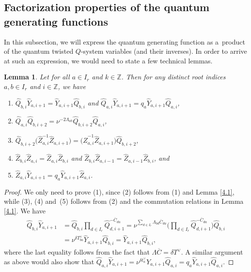 \documentclass[pdftex]{sigma}
\numberwithin{equation}{section}
\newtheorem{Lemma}[Theorem]{Lemma}
\begin{document}
\subsection{Factorization properties of the quantum generating functions}\label{Section 4.3}

In this subsection, we will express the quantum generating function  as a~product of the quantum twisted $Q$-system variables (and their inverses). In order to arrive at such an expression, we would need to state a few technical lemmas.

\begin{Lemma}\label{4.5}
Let  for all $a\in I_r$ and $k\in\mathbb{Z}$. Then for any distinct root indices $a,b\in I_r$ and $i\in\mathbb{Z}$, we have
\begin{enumerate}\itemsep=0pt
\item[$(1)$] $\widehat{Q}_{b,i}\widehat{Y}_{a,i+1}=\widehat{Y}_{a,i+1}\widehat{Q}_{b,i}$ and $\widehat{Q}_{a,i}\widehat{Y}_{a,i+1}=q_a\widehat{Y}_{a,i+1}\widehat{Q}_{a,i}$,
\item[$(2)$] $\widehat{Q}_{a,i}\widehat{Q}_{b,i+2}=\nu^{-2\Lambda_{ab}}\widehat{Q}_{b,i+2}\widehat{Q}_{a,i}$,
\item[$(3)$] $\widehat{Q}_{b,i+2}\bigl(\widehat{Z}_{a,i}^{-1}\widehat{Z}_{a,i+1}\bigr)=\bigl(\widehat{Z}_{a,i}^{-1}\widehat{Z}_{a,i+1}\bigr)\widehat{Q}_{b,i+2}$,
\item[$(4)$] $\widehat{Z}_{b,i}\widehat{Z}_{a,i}=\widehat{Z}_{a,i}\widehat{Z}_{b,i}$ and $\widehat{Z}_{b,i}\widehat{Z}_{a,i-1}=\widehat{Z}_{a,i-1}\widehat{Z}_{b,i}$, and
\item[$(5)$] $\widehat{Z}_{a,i}\widehat{Y}_{a,i+1}=q_a\widehat{Y}_{a,i+1}\widehat{Z}_{a,i}$.
\end{enumerate}
\end{Lemma}

\begin{proof}
We only need to prove (1), since (2) follows from (1) and Lemma \ref{4.1}, while (3), (4) and~(5) follows from (2) and the commutation relations in Lemma \ref{4.1}. We have
\begin{align*}
\widehat{Q}_{b,i}\widehat{Y}_{a,i+1}
&=\widehat{Q}_{b,i}\prod_{d\in I_r}\widehat{Q}_{d,i+1}^{-\overline{C}_{da}}=\nu^{\sum_{d\in I_r}\Lambda_{bd}\overline{C}_{da}}\biggl(\prod_{d\in I_r}\widehat{Q}_{d,i+1}^{-\overline{C}_{da}}\biggr)\widehat{Q}_{b,i}\\
&=\nu^{\delta T_{ba}^{\vee}}\widehat{Y}_{a,i+1}\widehat{Q}_{b,i}=\widehat{Y}_{a,i+1}\widehat{Q}_{b,i},
\end{align*}
where the last equality follows from the fact that $\Lambda\overline{C}=\delta T^{\vee}$. A similar argument as above would also show that $\widehat{Q}_{a,i}\widehat{Y}_{a,i+1}=\nu^{\delta t_a^{\vee}}\widehat{Y}_{a,i+1}\widehat{Q}_{a,i}=q_a\widehat{Y}_{a,i+1}\widehat{Q}_{a,i}$.
\end{proof}
\end{document}
